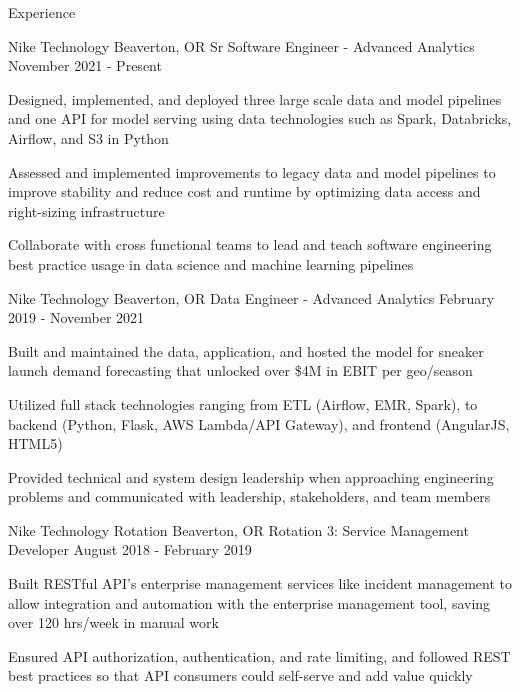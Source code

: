 \documentclass{resume}
\begin{document}
\begin{rSection}{Experience}

\begin{rSubsection}{Nike Technology}
                   {Beaverton, OR}
                   {Sr Software Engineer - Advanced Analytics}
                   {November 2021 - Present}
    \item Designed, implemented, and deployed three large scale data and model pipelines and one API for model serving
          using data technologies such as Spark, Databricks, Airflow, and S3 in Python
    \item Assessed and implemented improvements to legacy data and model pipelines to improve stability and reduce cost and runtime
          by optimizing data access and right-sizing infrastructure
    \item Collaborate with cross functional teams to lead and teach software engineering best practice usage in data science and machine learning pipelines
\vspace{-2mm}
\end{rSubsection}


\begin{rSubsection}{Nike Technology}
                   {Beaverton, OR}
                   {Data Engineer - Advanced Analytics}
                   {February 2019 - November 2021}
    \item Built and maintained the data, application, and hosted the model for sneaker launch
          demand forecasting that unlocked over \$4M in EBIT per geo/season
    \item Utilized full stack technologies ranging from ETL (Airflow, EMR, Spark), to
          backend (Python, Flask, AWS Lambda/API Gateway), and frontend (AngularJS, HTML5)
    \item Provided technical and system design leadership when approaching engineering
          problems and communicated with leadership, stakeholders, and team members
\vspace{-2mm}
\end{rSubsection}


\begin{rSubsection}{Nike Technology Rotation}
                   {Beaverton, OR}
                   {Rotation 3: Service Management Developer}
                   {August 2018 - February 2019}
    \item Built RESTful API's enterprise management services like incident management
          to allow integration and automation with the enterprise management tool, saving
          over 120 hrs/week in manual work
    \item Ensured API authorization, authentication, and rate limiting, and followed REST best practices
          so that API consumers could self-serve and add value quickly


\end{rSubsection}
\end{rSection}
\end{document}
